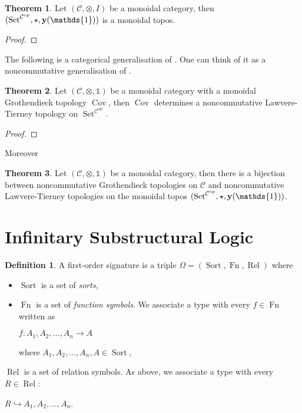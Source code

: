 \documentclass[8pt]{article}
\theoremstyle{definition}
\newtheorem{definition}{Definition}[section]
\theoremstyle{definition}
\newtheorem{theorem}{Theorem}[section]
\theoremstyle{definition}
\theoremstyle{definition}
\theoremstyle{definition}
\theoremstyle{definition}
\theoremstyle{definition}
\theoremstyle{definition}
\theoremstyle{definition}
\theoremstyle{definition}
\theoremstyle{definition}
\theoremstyle{definition}
\theoremstyle{definition}
\theoremstyle{question}
\begin{document}
\begin{theorem}
  Let $(\mathcal{C}, \otimes, I)$ be a monoidal category, then 
  $(\operatorname{Set}^{\mathcal{C}^{\operatorname{op}}}, \star, {\bf y}(\mathds{1}))$ is a monoidal topos.
\end{theorem}

\begin{proof}

\end{proof}

The following is a categorical generalisation of \cite[Theorem 5]{goldblatt2006kripke}.
One can think of it as a noncommutative generalisation of \cite[§V.1, Theorem 2]{maclane2012sheaves}.
\begin{theorem}
  Let $(\mathcal{C}, \otimes, \mathds{1})$ be a monoidal category with a monoidal Grothendieck topology $\operatorname{Cov}$,
  then $\operatorname{Cov}$ determines a noncommutative Lawvere-Tierney topology on $\operatorname{Set}^{\mathcal{C}^{\operatorname{op}}}$.
\end{theorem}

\begin{proof}

\end{proof}

Moreover
\begin{theorem}
  Let $(\mathcal{C}, \otimes, \mathds{1})$ be a monoidal category, then there is a bijection
  between noncommutative Grothendieck topologies on $\mathcal{C}$ and
  noncommutative Lawvere-Tierney topologies on the monoidal topos $(\operatorname{Set}^{\mathcal{C}^{\operatorname{op}}}, \star, {\bf y}(\mathds{1}))$.
\end{theorem}

\section{Infinitary Substructural Logic}

\begin{definition}
A first-order signature is a triple $\Omega = (\operatorname{Sort}, \operatorname{Fn}, \operatorname{Rel})$
where
\begin{itemize}
  \item $\operatorname{Sort}$ is a set of \emph{sorts},
  \item $\operatorname{Fn}$ is a set of \emph{function symbols}. We associate a type with every $f \in \operatorname{Fn}$ written as
  \begin{center}
    $f : A_1, A_2, \ldots, A_n \to A$
  \end{center}
  where $A_1, A_2, \ldots, A_n, A \in \operatorname{Sort}$,
\end{itemize}
  \item $\operatorname{Rel}$ is a set of relation symbols. As above, we associate a type with every $R \in \operatorname{Rel}$:
  \begin{center}
    $R \hookrightarrow A_1, A_2, \ldots, A_n$.
  \end{center}
\end{definition}
\end{document}

